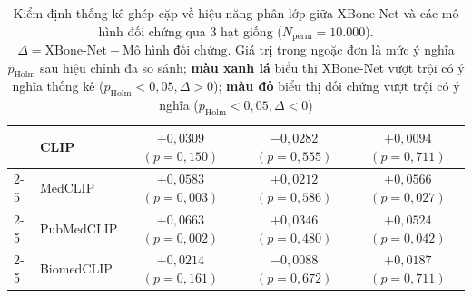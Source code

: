 \begin{table}[H]
{\begin{tabular}{|l|l|c|c|c|}
 & CLIP & $+0{,}0309$ \scriptsize$(p = 0{,}150)$ & $-0{,}0282$ \scriptsize$(p = 0{,}555)$ & $+0{,}0094$ \scriptsize$(p = 0{,}711)$ \\ \cline{2-5}
 & MedCLIP & \textcolor[RGB]{0, 135, 0}{\textbf{$+0{,}0583$ \scriptsize$(p = 0{,}003)$}} & $+0{,}0212$ \scriptsize$(p = 0{,}586)$ & \textcolor[RGB]{0, 135, 0}{\textbf{$+0{,}0566$ \scriptsize$(p = 0{,}027)$}} \\ \cline{2-5}
 & PubMedCLIP & \textcolor[RGB]{0, 135, 0}{\textbf{$+0{,}0663$ \scriptsize$(p = 0{,}002)$}} & $+0{,}0346$ \scriptsize$(p = 0{,}480)$ & \textcolor[RGB]{0, 135, 0}{\textbf{$+0{,}0524$ \scriptsize$(p = 0{,}042)$}} \\ \cline{2-5}
 & BiomedCLIP & $+0{,}0214$ \scriptsize$(p = 0{,}161)$ & $-0{,}0088$ \scriptsize$(p = 0{,}672)$ & $+0{,}0187$ \scriptsize$(p = 0{,}711)$ \\ \hline
\end{tabular}
}
\caption{Kiểm định thống kê ghép cặp về hiệu năng phân lớp giữa XBone-Net và các mô hình đối chứng qua 3 hạt giống ($N_{\mathrm{perm}}=10.000$). $\Delta = \text{XBone-Net} - \text{Mô hình đối chứng}$. Giá trị trong ngoặc đơn là mức ý nghĩa $p_{\mathrm{Holm}}$ sau hiệu chỉnh đa so sánh; \textcolor[RGB]{0, 135, 0}{\textbf{màu xanh lá}} biểu thị XBone-Net vượt trội có ý nghĩa thống kê ($p_{\mathrm{Holm}} < 0{,}05, \Delta > 0$); \textcolor[RGB]{200, 0, 0}{\textbf{màu đỏ}} biểu thị đối chứng vượt trội có ý nghĩa ($p_{\mathrm{Holm}} < 0{,}05, \Delta < 0$)}
\label{tab:paired_baseline_classification}
\end{table}
